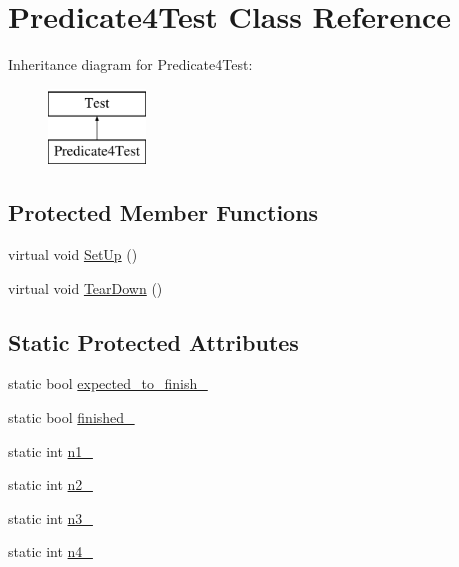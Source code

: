 \hypertarget{classPredicate4Test}{\section{\-Predicate4\-Test \-Class \-Reference}
\label{da/d30/classPredicate4Test}
}
\-Inheritance diagram for \-Predicate4\-Test\-:\begin{figure}[H]
\begin{center}
\leavevmode
\includegraphics[height=2.000000cm]{da/d30/classPredicate4Test}
\end{center}
\end{figure}
\subsection*{\-Protected \-Member \-Functions}
\begin{DoxyCompactItemize}
\item 
virtual void \hyperlink{classPredicate4Test_a901706a587f9ae84df8b2395fbe759cb}{\-Set\-Up} ()
\item 
virtual void \hyperlink{classPredicate4Test_a870a092058305911f3d42df45dd657e5}{\-Tear\-Down} ()
\end{DoxyCompactItemize}
\subsection*{\-Static \-Protected \-Attributes}
\begin{DoxyCompactItemize}
\item 
static bool \hyperlink{classPredicate4Test_af30fae6aaebdd5a6cb055c420573754d}{expected\-\_\-to\-\_\-finish\-\_\-}
\item 
static bool \hyperlink{classPredicate4Test_a9189d6cfedf2ace6f5f6aa152ba38f83}{finished\-\_\-}
\item 
static int \hyperlink{classPredicate4Test_a7a61c539c18d10f12696fc25b115d699}{n1\-\_\-}
\item 
static int \hyperlink{classPredicate4Test_a7dc886196252de63d1ca064997069377}{n2\-\_\-}
\item 
static int \hyperlink{classPredicate4Test_a08d9124d5401436eacd3e57dae0dbe2f}{n3\-\_\-}
\item 
static int \hyperlink{classPredicate4Test_aff849f20105b63bab116cb4e43ea8486}{n4\-\_\-}
\end{DoxyCompactItemize}


